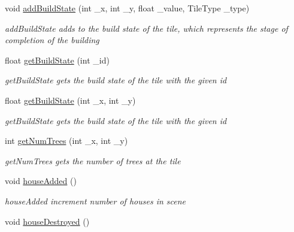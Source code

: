 \begin{DoxyCompactItemize}
void \hyperlink{class_grid_a8700734fcba19c23807a4774f3b386ff}{add\+Build\+State} (int \+\_\+x, int \+\_\+y, float \+\_\+value, Tile\+Type \+\_\+type)
\begin{DoxyCompactList}\small\item\em add\+Build\+State adds to the build state of the tile, which represents the stage of completion of the building \end{DoxyCompactList}\item 
float \hyperlink{class_grid_a97946c69f980f92b346fda6e7f79c43d}{get\+Build\+State} (int \+\_\+id)
\begin{DoxyCompactList}\small\item\em get\+Build\+State gets the build state of the tile with the given id \end{DoxyCompactList}\item 
float \hyperlink{class_grid_a9fd9d738f30f7ff7520ad2e61372d4d8}{get\+Build\+State} (int \+\_\+x, int \+\_\+y)
\begin{DoxyCompactList}\small\item\em get\+Build\+State gets the build state of the tile with the given id \end{DoxyCompactList}\item 
int \hyperlink{class_grid_a1948d865b653c8f9ab0db8d0345655d2}{get\+Num\+Trees} (int \+\_\+x, int \+\_\+y)
\begin{DoxyCompactList}\small\item\em get\+Num\+Trees gets the number of trees at the tile \end{DoxyCompactList}\item 
\hypertarget{class_grid_a1b687d4b17e9e38a25e96f40b154c0a5}{}void \hyperlink{class_grid_a1b687d4b17e9e38a25e96f40b154c0a5}{house\+Added} ()\label{class_grid_a1b687d4b17e9e38a25e96f40b154c0a5}

\begin{DoxyCompactList}\small\item\em house\+Added increment number of houses in scene \end{DoxyCompactList}\item 
\hypertarget{class_grid_a7d3b7faad6b2885178d1740afb631817}{}void \hyperlink{class_grid_a7d3b7faad6b2885178d1740afb631817}{house\+Destroyed} ()\label{class_grid_a7d3b7faad6b2885178d1740afb631817}


\end{DoxyCompactItemize}
